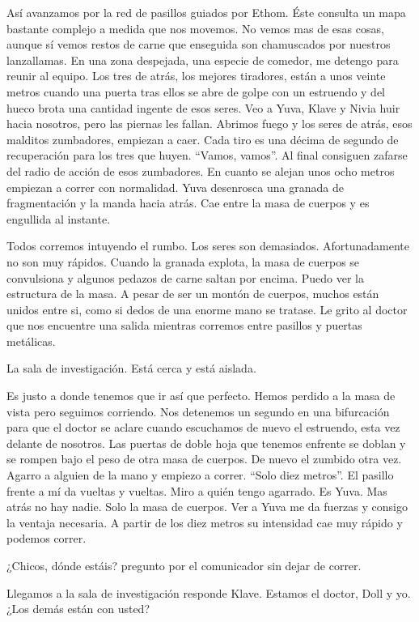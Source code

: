 Así avanzamos por la red de pasillos guiados por Ethom. Éste consulta un mapa bastante complejo a medida que nos movemos. No vemos mas de esas cosas, aunque sí vemos restos de carne que enseguida son chamuscados por nuestros lanzallamas. En una zona despejada, una especie de comedor, me detengo para reunir al equipo. Los tres de atrás, los mejores tiradores, están a unos veinte metros cuando una puerta tras ellos se abre de golpe con un estruendo y del hueco brota una cantidad ingente de esos seres. Veo a Yuva, Klave y Nivia huir hacia nosotros, pero las piernas les fallan. Abrimos fuego y los seres de atrás, esos malditos zumbadores, empiezan a caer. Cada tiro es una décima de segundo de recuperación para los tres que huyen. ``Vamos, vamos''. Al final consiguen zafarse del radio de acción de esos zumbadores. En cuanto se alejan unos ocho metros empiezan a correr con normalidad. Yuva desenrosca una granada de fragmentación y la manda hacia atrás. Cae entre la masa de cuerpos y es engullida al instante.

Todos corremos intuyendo el rumbo. Los seres son demasiados. Afortunadamente no son muy rápidos. Cuando la granada explota, la masa de cuerpos se convulsiona y algunos pedazos de carne saltan por encima. Puedo ver la estructura de la masa. A pesar de ser un montón de cuerpos, muchos están unidos entre si, como si dedos de una enorme mano se tratase.
Le grito al doctor que nos encuentre una salida mientras corremos entre pasillos y puertas metálicas.

\reply La sala de investigación. Está cerca y está aislada.

Es justo a donde tenemos que ir así que perfecto. Hemos perdido a la masa de vista pero seguimos corriendo. Nos detenemos un segundo en una bifurcación para que el doctor se aclare cuando escuchamos de nuevo el estruendo, esta vez delante de nosotros. Las puertas de doble hoja que tenemos enfrente se doblan y se rompen bajo el peso de otra masa de cuerpos. De nuevo el zumbido otra vez. Agarro a alguien de la mano y empiezo a correr. ``Solo diez metros''. El pasillo frente a mí da vueltas y vueltas. Miro a quién tengo agarrado. Es Yuva. Mas atrás no hay nadie. Solo la masa de cuerpos. Ver a Yuva me da fuerzas y consigo la ventaja necesaria. A partir de los diez metros su intensidad cae muy rápido y podemos correr.

\reply ¿Chicos, dónde estáis? \pause pregunto por el comunicador sin dejar de correr.

\reply Llegamos a la sala de investigación \pause responde Klave\pauseend. Estamos el doctor, Doll y yo. ¿Los demás están con usted?

